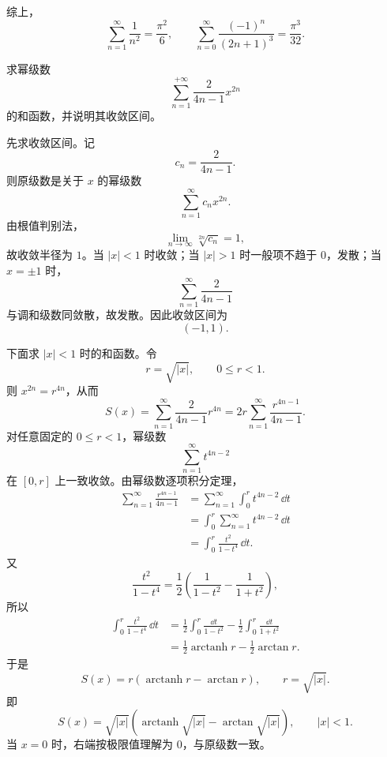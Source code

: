 \begin{question}[20分]
\begin{solution}
综上，
\[
  \boxed{\displaystyle \sum_{n=1}^{\infty}\frac1{n^2}=\frac{\pi^2}{6}},
  \qquad
  \boxed{\displaystyle \sum_{n=0}^{\infty}\frac{(-1)^n}{(2n+1)^3}=\frac{\pi^3}{32}}.
\]
\end{solution}
\end{question}

\begin{question}[15分]
求幂级数
\[
  \sum_{n=1}^{+\infty}\frac{2}{4n-1}x^{2n}
\]
的和函数，并说明其收敛区间。
\begin{solution}
先求收敛区间。记
\[
  c_n=\frac{2}{4n-1}.
\]
则原级数是关于 $x$ 的幂级数
\[
  \sum_{n=1}^{\infty}c_n x^{2n}.
\]
由根值判别法，
\[
  \lim_{n\to\infty}\sqrt[2n]{c_n}=1,
\]
故收敛半径为 $1$。当 $|x|<1$ 时收敛；当 $|x|>1$ 时一般项不趋于 $0$，发散；当 $x=\pm1$ 时，
\[
  \sum_{n=1}^{\infty}\frac{2}{4n-1}
\]
与调和级数同敛散，故发散。因此收敛区间为
\[
  (-1,1).
\]

下面求 $|x|<1$ 时的和函数。令
\[
  r=\sqrt{|x|},
  \qquad 0\le r<1.
\]
则 $x^{2n}=r^{4n}$，从而
\[
  S(x)=\sum_{n=1}^{\infty}\frac{2}{4n-1}r^{4n}
  =2r\sum_{n=1}^{\infty}\frac{r^{4n-1}}{4n-1}.
\]
对任意固定的 $0\le r<1$，幂级数
\[
  \sum_{n=1}^{\infty}t^{4n-2}
\]
在 $[0,r]$ 上一致收敛。由幂级数逐项积分定理，
\[
\begin{aligned}
  \sum_{n=1}^{\infty}\frac{r^{4n-1}}{4n-1}
  &=
  \sum_{n=1}^{\infty}\int_0^r t^{4n-2}\,\dd t  \\
  &=
  \int_0^r\sum_{n=1}^{\infty}t^{4n-2}\,\dd t  \\
  &=
  \int_0^r\frac{t^2}{1-t^4}\,\dd t .
\end{aligned}
\]
又
\[
  \frac{t^2}{1-t^4}
  =
  \frac12\left(\frac1{1-t^2}-\frac1{1+t^2}\right),
\]
所以
\[
\begin{aligned}
  \int_0^r\frac{t^2}{1-t^4}\,\dd t
  &=
  \frac12\int_0^r\frac{\dd t}{1-t^2}
  -\frac12\int_0^r\frac{\dd t}{1+t^2}  \\
  &=
  \frac12\operatorname{arctanh}r-\frac12\arctan r.
\end{aligned}
\]
于是
\[
  S(x)
  =
  r\left(\operatorname{arctanh}r-\arctan r\right),
  \qquad r=\sqrt{|x|}.
\]
即
\[
  \boxed{\displaystyle
  S(x)=
  \sqrt{|x|}
  \left(
    \operatorname{arctanh}\sqrt{|x|}
    -\arctan\sqrt{|x|}
  \right),
  \qquad |x|<1 .}
\]
当 $x=0$ 时，右端按极限值理解为 $0$，与原级数一致。
\end{solution}
\end{question}

